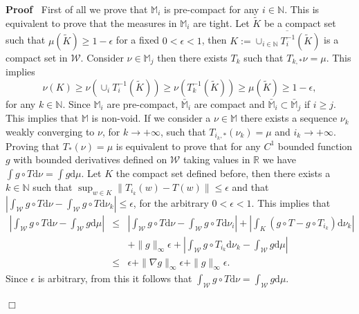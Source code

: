 \documentclass[a4paper,10pt]{article}
\newcommand{\assign}{:=}
\newcommand{\asterisk}{\mathord{*}}
\newcommand{\mathd}{\mathrm{d}}
\newenvironment{proof}{\noindent\textbf{Proof\ }}{\hspace*{\fill}$\Box$\medskip}
\begin{document}
\begin{proof}
  First of all we prove that $\mathbb{M}_i$ is pre-compact for any $i \in
  \mathbb{N}$. This is equivalent to prove that the measures in $\mathbb{M}_i$
  are tight. Let $\tilde{K}$ be a compact set such that $\mu (\tilde{K})
  \geqslant 1 - \epsilon$ for a fixed $0 < \epsilon < 1$, then $K \assign
  \overline{\cup_{i \in \mathbb{N}} T^{- 1}_i (\tilde{K})}$ is a compact set
  in $\mathcal{W}$. Consider $\nu \in \mathbb{M}_j$ then there exists $T_k$
  such that $T_{k, \asterisk} \nu = \mu$. This implies
  \[ \nu (K) \geqslant \nu (\cup_i T^{- 1}_i (\tilde{K})) \geqslant \nu (T^{-
     1}_k (\tilde{K})) \geqslant \mu (\tilde{K}) \geqslant 1 - \epsilon, \]
  for any $k \in \mathbb{N}$. Since $\mathbb{M}_i$ are pre-compact,
  $\bar{\mathbb{M}}_i$ are compact and $\bar{\mathbb{M}}_i \subset
  \bar{\mathbb{M}}_j$ if $i \geqslant j$. This implies that $\mathbb{M}$ is
  non-void. If we consider a $\nu \in \mathbb{M}$ there exists a sequence
  $\nu_k$ weakly converging to $\nu$, for $k \rightarrow + \infty$, such that
  $T_{i_k, \asterisk} (\nu_k) = \mu$ and $i_k \rightarrow + \infty$. Proving
  that $T_{\asterisk} (\nu) = \mu$ is equivalent to prove that for any $C^1$
  bounded function $g$ with bounded derivatives defined on $\mathcal{W}$
  taking values in $\mathbb{R}$ we have $\int g \circ T \mathd \nu = \int g
  \mathd \mu$. Let $K$ the compact set defined before, then there exists a $k
  \in \mathbb{N}$ such that $\sup_{w \in K} \| T_{i_k} (w) - T (w) \|
  \leqslant \epsilon$ and that $\left| \int_{\mathcal{W}} g \circ T \mathd \nu
  - \int_{\mathcal{W}} g \circ T \mathd \nu_k \right| \leqslant \epsilon$, for
  the arbitrary $0 < \epsilon < 1$. This implies that
  \begin{eqnarray}
    \left| \int_{\mathcal{W}} g \circ T \mathd \nu - \int_{\mathcal{W}} g
    \mathd \mu \right| & \leqslant & \left| \int_{\mathcal{W}} g \circ T
    \mathd \nu - \int_{\mathcal{W}} g \circ T \mathd \nu_i \right| + \left|
    \int_K (g \circ T - g \circ T_{i_k}) \mathd \nu_k \right| \nonumber\\
    &  & + \| g \|_{\infty} \epsilon + \left| \int_{\mathcal{W}} g \circ
    T_{i_k} \mathd \nu_k - \int_{\mathcal{W}} g \mathd \mu \right| \nonumber\\
    & \leqslant & \epsilon + \| \nabla g \|_{\infty} \epsilon + \| g
    \|_{\infty} \epsilon . \nonumber
  \end{eqnarray}
  Since $\epsilon$ is arbitrary, from this it follows that
  $\int_{\mathcal{W}} g \circ T \mathd \nu = \int_{\mathcal{W}} g \mathd \mu$.
  
\end{proof}
\end{document}
